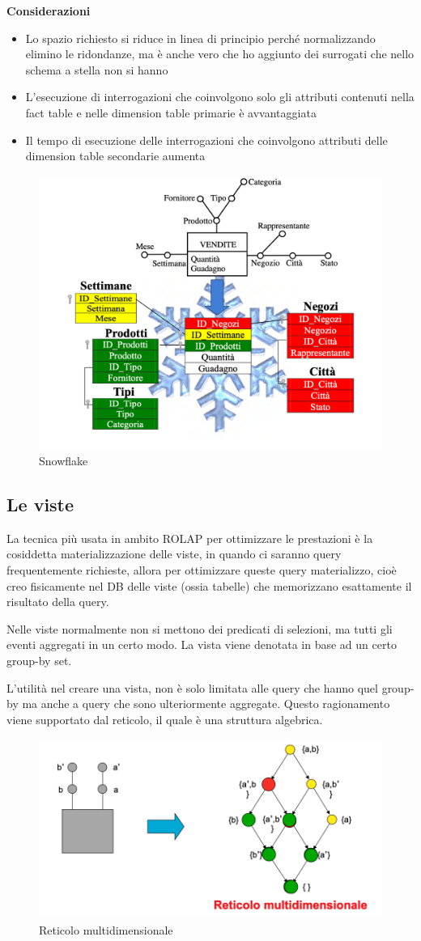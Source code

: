 \textbf{Considerazioni}

\begin{itemize}
	\item
	Lo spazio richiesto si riduce in linea di principio perché normalizzando elimino le ridondanze, ma è anche vero che ho aggiunto dei surrogati che nello schema a stella non si hanno
	\item 
	L’esecuzione di interrogazioni che coinvolgono solo gli attributi contenuti nella fact table e nelle dimension table primarie è avvantaggiata
	\item 
	Il tempo di esecuzione delle interrogazioni che coinvolgono attributi delle dimension table secondarie aumenta
\end{itemize}
\begin{figure}[H]
	\centering
	\includegraphics[width=0.6\linewidth]{img/snowflake}
	\caption{Snowflake}
	\label{fig:snowflake}
\end{figure}

\subsection{Le viste}
La tecnica più usata in ambito ROLAP per ottimizzare le prestazioni è la cosiddetta materializzazione delle viste, in quando ci saranno query frequentemente richieste, allora per ottimizzare queste query materializzo, cioè creo fisicamente nel DB delle viste (ossia tabelle) che memorizzano esattamente il risultato della query. 

Nelle viste normalmente non si mettono dei predicati di selezioni, ma tutti gli eventi aggregati in un certo modo. La vista viene denotata in base ad un certo group-by set. 

L’utilità nel creare una vista, non è solo limitata alle query che hanno quel group-by ma anche a query che sono ulteriormente aggregate. Questo ragionamento viene supportato dal reticolo, il quale è una struttura algebrica.
\begin{figure}[H]
	\centering
	\includegraphics[width=0.6\linewidth]{img/reticolo}
	\caption{Reticolo multidimensionale}
	\label{fig:reticolo}
\end{figure}

